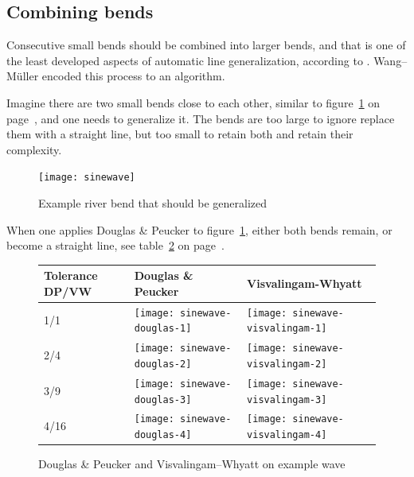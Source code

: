 \documentclass[a4paper]{article}
\newcommand{\DP}{Douglas \& Peucker}
\newcommand{\VW}{Visvalingam--Whyatt}
\newcommand{\WM}{Wang--M{\"u}ller}
\begin{document}
\subsection{Combining bends}

Consecutive small bends should be combined into larger bends, and that is one
of the least developed aspects of automatic line generalization, according to
\cite{miuller1995generalization}. {\WM} encoded this process to an algorithm.

Imagine there are two small bends close to each other, similar to
figure~\ref{pic:sinewave} on page~\pageref{pic:sinewave}, and one needs
to generalize it. The bends are too large to ignore replace them with a
straight line, but too small to retain both and retain their complexity.

\begin{figure}[h]
    \centering
    \texttt{[image: sinewave]}
    \caption{Example river bend that should be generalized}
    \label{pic:sinewave}
\end{figure}

When one applies {\DP} to figure~\ref{pic:sinewave}, either both bends remain,
or become a straight line, see table~\ref{tab:comparison-sinewave} on
page~\pageref{tab:comparison-sinewave}.

\begin{figure}[h]
    \renewcommand{\tabularxcolumn}[1]{>{\center\small}m{#1}}
    \begin{tabularx}{\textwidth}{ p{1.5cm} | X | X | }
        Tolerance DP/VW                                            &
        Douglas \& Peucker                                         &
        Visvalingam-Whyatt                                         \tabularnewline \hline

        1/1                                                        &
        \texttt{[image: sinewave-douglas-1]}     &
        \texttt{[image: sinewave-visvalingam-1]} \tabularnewline \hline

        2/4                                                        &
        \texttt{[image: sinewave-douglas-2]}     &
        \texttt{[image: sinewave-visvalingam-2]} \tabularnewline \hline

        3/9                                                        &
        \texttt{[image: sinewave-douglas-3]}     &
        \texttt{[image: sinewave-visvalingam-3]} \tabularnewline \hline

        4/16                                                       &
        \texttt{[image: sinewave-douglas-4]}     &
        \texttt{[image: sinewave-visvalingam-4]} \tabularnewline \hline

    \end{tabularx}
    \caption{{\DP} and {\VW} on example wave}
    \label{tab:comparison-sinewave}
\end{figure}
\end{document}
